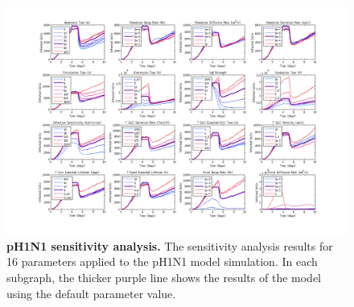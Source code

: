 \documentclass[10pt]{article}
\newcommand{\drew}[1]{{\color{dkgreen}#1}}
\begin{document}
\begin{landscape}
\begin{figure}[ht!]
\begin{center}
	\includegraphics[width=9in]{Figure_S5}
	\caption{\textbf{pH1N1 sensitivity analysis.} The sensitivity analysis results for 16 parameters applied to the pH1N1 model simulation.  In each subgraph, the thicker purple line shows the results of the model using the default parameter value.}
	\label{fig:psensitivity}
\end{center}
\end{figure}

\end{landscape}




\setcounter{figure}{0}
\renewcommand{\figurename}{Video}
\end{document}
